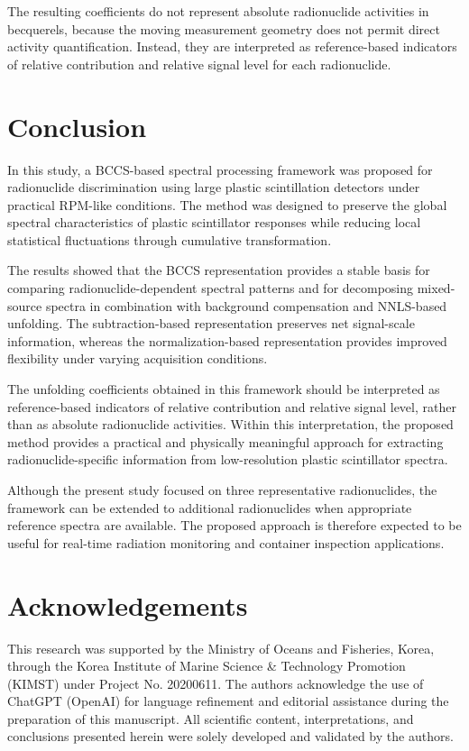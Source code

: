 \documentclass[fleqn, 10pt]{wlscirep}
\begin{document}
The resulting coefficients do not represent absolute radionuclide activities in becquerels, because the moving measurement geometry does not permit direct activity quantification. Instead, they are interpreted as reference-based indicators of relative contribution and relative signal level for each radionuclide.






\section*{Conclusion}

In this study, a BCCS-based spectral processing framework was proposed for radionuclide discrimination using large plastic scintillation detectors under practical RPM-like conditions. The method was designed to preserve the global spectral characteristics of plastic scintillator responses while reducing local statistical fluctuations through cumulative transformation.

The results showed that the BCCS representation provides a stable basis for comparing radionuclide-dependent spectral patterns and for decomposing mixed-source spectra in combination with background compensation and NNLS-based unfolding. The subtraction-based representation preserves net signal-scale information, whereas the normalization-based representation provides improved flexibility under varying acquisition conditions.

The unfolding coefficients obtained in this framework should be interpreted as reference-based indicators of relative contribution and relative signal level, rather than as absolute radionuclide activities. Within this interpretation, the proposed method provides a practical and physically meaningful approach for extracting radionuclide-specific information from low-resolution plastic scintillator spectra.

Although the present study focused on three representative radionuclides, the framework can be extended to additional radionuclides when appropriate reference spectra are available. The proposed approach is therefore expected to be useful for real-time radiation monitoring and container inspection applications.


\section*{Acknowledgements}

This research was supported by the Ministry of Oceans and Fisheries, Korea, through the Korea Institute of Marine Science \& Technology Promotion (KIMST) under Project No. 20200611. The authors acknowledge the use of ChatGPT (OpenAI) for language refinement and editorial assistance during the preparation of this manuscript. All scientific content, interpretations, and conclusions presented herein were solely developed and validated by the authors.
\end{document}
